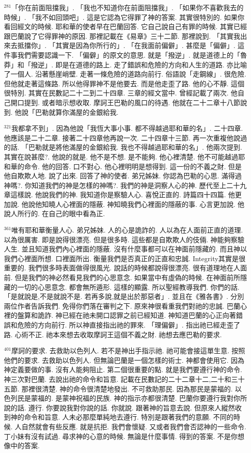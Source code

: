\documentclass{book}
\begin{document}
$^{281}$「你在前面阻擋我」.
「我也不知道你在前面阻擋我」.
「如果你不喜歡我去的時候」.
「我不如回頭吧」.
這是它認為它得罪了神的答案.
其實很特別的.
如果你看回經文的時候.
耶和華的使者早在巴蘭回答.
它自己說自己有罪的時候.
其實已經跟巴蘭說了它得罪神的原因.
那裡記載在《易章》三十二節.
那裡說到.
「其實我出來去抵擋你」.
「其實是因為你所行的」.
「在我面前偏僻」.
甚麼是「偏僻」.
這件事我們需要認識一下.
「偏僻」的原文的意思.
就是「撥逆」.
就是道德上的「魯莽」和「撥逆」.
即是在道德的路上.
走了錯誤和危險的方向和人生的道路.
亦比喻了一個人.
沿著懸崖峭壁.
走著一條危險的道路向前行.
俗語說「走鋼線」.
很危險.
但他就走著這條路.
所以他得罪神不是他要去.
而是他走歪了路.
他的心不靜.
這個很特別.
其實在民數記二十二到二十四章.
三章的經文當中.
曾經記載了兩次.
他自己開口提到.
或者暗示想收取.
摩訶王巴勒的風口的待遇.
他就在二十二章十八節說到.
他說「巴勒就算你滿屋的金銀給我.

$^{321}$我都拿不到」.
因為他說「我恆大事小事.
都不得越過耶和華的名」.
二十四章.
他應該是二十二章.
接著二十四章他再說一次.
二十四章十三節.
再一次重複他說過的話.
「巴勒就是將他滿屋的金銀給我.
我也不得越過耶和華的名」.
他兩次提到.
其實在說甚麼?.
他說的就是.
他不是不想.
是不能夠.
他心裡清楚.
他不可能越過耶和華的命令.
他的回答.
口不對心.
他心裡明明是想得到.
這一份的不義之財.
但是他自欺欺人地.
說了出來.
回答了神的使者.
弟兄姊妹.
你認為巴勒的心思.
滿得過神嗎?.
你知道我們的神是怎樣的神嗎?.
我們的神是洞察人心的神.
歷代至上二十九章這樣說.
他說我們的神.
我知道你是察驗人心.
喜悅正直的.
詩篇四十四篇.
他更加說.
他說他知曉人心裡面的隱蔽.
神知曉我們心裡面的隱蔽的事.
心言更加說.
他說人所行的.
在自己的眼中看為正.

$^{361}$唯有耶和華衡量人心.
弟兄姊妹.
人的心是詭詐的.
人以為在人面前正直的道理.
以為很厲害.
即是說得很漂亮.
但是很多時.
這些都是自欺欺人的伎倆.
神能夠察驗人生.
並且知道我們內心裡面的隱蔽.
沒有什麼事都可以在神面前隱藏的.
而且神以我們心裡面所想.
口裡面所出.
衡量我們是否真正的正直和忠誠.
Integrity其實是很重要的.
我們很多時表面做得很風光.
說話的時候都說得很漂亮.
很有道理地在人面前.
但是我們的神必然看見我們的心思意念.
如果當中有虛偽的時候.
在神面前所隱藏的一切的心思意念.
都會無所遁形.
這樣的顯露.
所以聖經教導我們.
你們的話.
「是就說是,不是就說不是.
若再多說,就是出於那惡者」.
並且在《雅各書》.
分別兩位作者告訴我們.
免得你們落在審判之下.
原來神很看重我們對祂的忠誠.
巴蘭心裡的盤算和詭詐.
神已經在祂未開口認罪之前已經知道.
神知道巴蘭的心正向著錯誤和危險的方向前行.
所以神直接指出祂的罪來.
「理偏僻」.
指出祂已經走歪了路.
心術不正.
祂本來想去收取摩訶王這個不義之財.
祂想去應巴勒的要求.

$^{401}$摩訶的要求.
去救助以色列人.
若不是神出手指示祂.
祂可能會接這單生意.
按照他們的要求.
去救助以色列人.
但無論巴蘭是一個怎樣的術士.
神都會使用它.
因為神定義要做的事.
沒有人能夠阻止.
第二個很重要的點.
就是我們要遵行神的命令.
神三次對巴蘭.
去說出祂的命令和旨意.
記載在民數記的二十二章十二,二十和三十五節.
那裡很清楚.
神的命令很清楚地發出.
不可救助那民.
因為那民是蒙福的.
以色列民是蒙福的.
是蒙神祝福的民族.
神的指示亦都很清楚.
巴蘭你要遵行我對你所說的話.
遵行.
你要說我對你說的話.
你就說.
跟著神的旨意去說.
但原來人縱然收到神的命令和旨意.
人未必那麼單純地去遵行.
特別是跟著我們的意願.
不同的時候.
人自然就會有些反應.
就是抗拒.
我們會懷疑.
又或者我們會否認神的一些命令.
丁小妹有沒有試過.
尋求神的心意的時候.
無論是什麼事情.
得到的答案.
不是你想像中的答案.
\end{document}
